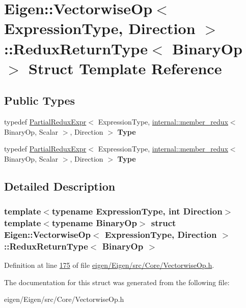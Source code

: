 \hypertarget{struct_eigen_1_1_vectorwise_op_1_1_redux_return_type}{}\section{Eigen\+:\+:Vectorwise\+Op$<$ Expression\+Type, Direction $>$\+:\+:Redux\+Return\+Type$<$ Binary\+Op $>$ Struct Template Reference}
\label{struct_eigen_1_1_vectorwise_op_1_1_redux_return_type}
\subsection*{Public Types}
\begin{DoxyCompactItemize}
\item 
\mbox{\label{struct_eigen_1_1_vectorwise_op_1_1_redux_return_type_a39c1f3a1be03b63e1a87c4da765c3b66}} 
typedef \hyperlink{group___core___module_class_eigen_1_1_partial_redux_expr}{Partial\+Redux\+Expr}$<$ Expression\+Type, \hyperlink{struct_eigen_1_1internal_1_1member__redux}{internal\+::member\+\_\+redux}$<$ Binary\+Op, Scalar $>$, Direction $>$ {\bfseries Type}
\item 
\mbox{\label{struct_eigen_1_1_vectorwise_op_1_1_redux_return_type_a39c1f3a1be03b63e1a87c4da765c3b66}} 
typedef \hyperlink{group___core___module_class_eigen_1_1_partial_redux_expr}{Partial\+Redux\+Expr}$<$ Expression\+Type, \hyperlink{struct_eigen_1_1internal_1_1member__redux}{internal\+::member\+\_\+redux}$<$ Binary\+Op, Scalar $>$, Direction $>$ {\bfseries Type}
\end{DoxyCompactItemize}


\subsection{Detailed Description}
\subsubsection*{template$<$typename Expression\+Type, int Direction$>$\newline
template$<$typename Binary\+Op$>$\newline
struct Eigen\+::\+Vectorwise\+Op$<$ Expression\+Type, Direction $>$\+::\+Redux\+Return\+Type$<$ Binary\+Op $>$}



Definition at line \hyperlink{eigen_2_eigen_2src_2_core_2_vectorwise_op_8h_source_l00175}{175} of file \hyperlink{eigen_2_eigen_2src_2_core_2_vectorwise_op_8h_source}{eigen/\+Eigen/src/\+Core/\+Vectorwise\+Op.\+h}.



The documentation for this struct was generated from the following file\+:\begin{DoxyCompactItemize}
\item 
eigen/\+Eigen/src/\+Core/\+Vectorwise\+Op.\+h\end{DoxyCompactItemize}
